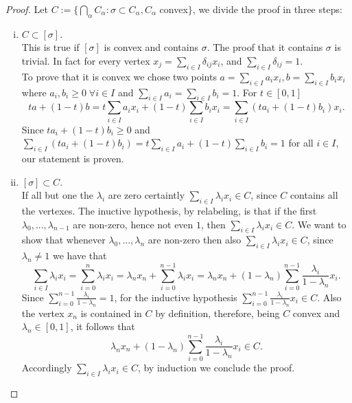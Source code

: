 \documentclass[../1.tex]{subfiles}
\begin{document}
    \begin{proof}
        Let $C := \{ \bigcap_\alpha C_\alpha : \sigma \subset C_\alpha, C_\alpha$ convex$\}$, we divide the proof in three steps:
        \begin{enumerate}[(i)]
            \item $C \subset [\sigma]$.\\
            This is true if $[\sigma]$ is convex and contains $\sigma$.
            The proof that it contains $\sigma$ is trivial. In fact for every vertex $x_j = \sum_{i \in I} \delta_{ij} x_i$,
            and $\sum_{i \in I}\delta_{ij} = 1$.\\
            To prove that it is convex we chose two points $a = \sum_{i \in I} a_i x_i, b = \sum_{i \in I} b_i x_i$ \\
            where $a_i,b_i \geq 0 \; \forall i \in I$ and $\sum_{i \in I} a_i = \sum_{i \in I} b_i = 1$. For $t \in [0,1]$
            \[ ta+(1-t)b = t\sum_{i \in I} a_i x_i + (1-t) \sum_{i \in I} b_i x_i = \sum_{i \in I} (ta_i + (1-t)b_i)x_i.\]
            Since $ta_i + (1-t)b_i \geq 0$ and $\sum_{i \in I} (ta_i + (1-t)b_i) = t\sum_{i \in I}a_i + (1-t)\sum_{i \in I}b_i = 1$ for all $i \in I$,
            our statement is proven.

            \item $[\sigma] \subset C$.\\
            If all but one the $\lambda_i$ are zero certaintly $\sum_{i \in I} \lambda_i x_i \in C$, since $C$ contains all the vertexes.
            The inuctive hypothesis, by relabeling, is that if the first $\lambda_0,...,\lambda_{n-1}$ are non-zero, hence not even $1$, then $\sum_{i \in I} \lambda_i x_i \in C$.
            We want to show that whenever $\lambda_0,...,\lambda_n$ are non-zero then also $\sum_{i \in I} \lambda_i x_i \in C$, since $\lambda_n \neq 1$ we have that
            \[ \sum_{i \in I} \lambda_i x_i =  \sum_{i = 0}^n \lambda_i x_i = \lambda_n x_n + \sum_{i = 0}^{n-1} \lambda_i x_i =
               \lambda_n x_n + (1 - \lambda_n) \sum_{i = 0}^{n-1} \frac{\lambda_i}{1 - \lambda_n} x_i.\]
            Since $\sum_{i = 0}^{n-1} \frac{\lambda_i}{1 - \lambda_n} = 1$, for the inductive hypothesis $\sum_{i = 0}^{n-1} \frac{\lambda_i}{1 - \lambda_n} x_i \in C$.
            Also the vertex $x_n$ is contained in $C$ by definition, therefore, being $C$ convex and $\lambda_n \in [0,1]$, it follows that 
            \[ \lambda_n x_n + (1 - \lambda_n) \sum_{i = 0}^{n-1} \frac{\lambda_i}{1 - \lambda_n} x_i \in C. \]
            Accordingly $\sum_{i \in I} \lambda_i x_i \in C$, by induction we conclude the proof.


\end{enumerate}
\end{proof}
\end{document}
